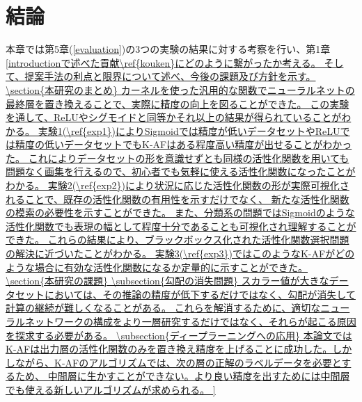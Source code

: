 \chapter{結論}
\label{conclusion}

本章では第5章(\ref{evaluation})の3つの実験の結果に対する考察を行い、第1章\ref{introductionで述べた貢献\ref{kouken}にどのように繋がったか考える。
そして、提案手法の利点と限界について述べ、今後の課題及び方針を示す。


\section{本研究のまとめ}

カーネルを使った汎用的な関数でニューラルネットの最終層を置き換えることで、実際に精度の向上を図ることができた。

この実験を通して、ReLUやシグモイドと同等かそれ以上の結果が得られていることがわかる。
 実験1(\ref{exp1})によりSigmoidでは精度が低いデータセットやReLUでは精度の低いデータセットでもK-AFはある程度高い精度が出せることがわかった。
これによりデータセットの形を意識せずとも同様の活性化関数を用いても問題なく画集を行えるので、初心者でも気軽に使える活性化関数になったことがわかる。
 実験2(\ref{exp2})により状況に応じた活性化関数の形が実際可視化されることで、既存の活性化関数の有用性を示すだけでなく、
 新たな活性化関数の模索の必要性を示すことができた。
 また、分類系の問題ではSigmoidのような活性化関数でも表現の幅として程度十分であることも可視化され理解することができた。
これらの結果により、ブラックボックス化された活性化関数選択問題の解決に近づいたことがわかる。
 実験3(\ref{exp3})ではこのようなK-AFがどのような場合に有効な活性化関数になるか定量的に示すことができた。



\section{本研究の課題}

\subsection{勾配の消失問題}
スカラー値が大きなデータセットにおいては、その推論の精度が低下するだけではなく、勾配が消失して計算の継続が難しくなることがある。
これらを解消するために、適切なニューラルネットワークの構成をより一層研究するだけではなく、それらが起こる原因を探求する必要がある。



\subsection{ディープラーニングへの応用}
本論文ではK-AFは出力層の活性化関数のみを置き換え精度を上げることに成功した。しかしながら、K-AFのアルゴリズムでは、次の層の正解のラベルデータを必要とするため、
中間層に生かすことができない。より良い精度を出すためには中間層でも使える新しいアルゴリズムが求められる。



}
